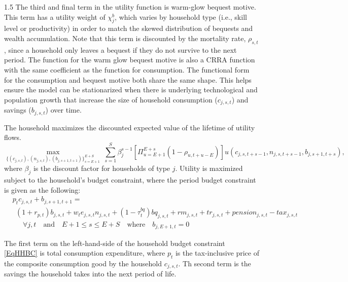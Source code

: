 \documentclass[letterpaper,12pt]{article}
\theoremstyle{definition}
\begin{document}
\begin{spacing}{1.5}
    The third and final term in the utility function is warm-glow bequest motive. This term has a utility weight of $\chi^b_j$, which varies by household type (i.e., skill level or productivity) in order to match the skewed distribution of bequests and wealth accumulation. Note that this term is discounted by the mortality rate, $\rho_{s,t}$, since a household only leaves a bequest if they do not survive to the next period. The function for the warm glow bequest motive is also a CRRA function with the same coefficient as the function for consumption. The functional form for the consumption and bequest motive both share the same shape. This helps ensure the model can be stationarized when there is underlying technological and population growth that increase the size of household consumption ($c_{j,s,t}$) and savings ($b_{j,s,t}$) over time.

    The household maximizes the discounted expected value of the lifetime of utility flows.
    \begin{equation}\label{EqHHmaxprob}
      \max_{\{(c_{j,s,t}),(n_{j,s,t}),(b_{j,s+1,t+1})\}_{s=E+1}^{E+S}}\: \sum_{s=1}^S\beta_j^{s-1}\left[\Pi_{u=E+1}^{E+s}(1 - \rho_{u,t+u-E})\right]u(c_{j,s,t+s-1},n_{j,s,t+s-1},b_{j,s+1,t+s}),
    \end{equation}
    where $\beta_j$ is the discount factor for households of type $j$.  Utility is maximized subject to the household's budget constraint, where the period budget constraint is given as the following:
    \begin{equation}\label{EqHHBC}
      \begin{split}
        &p_t c_{j,s,t} + b_{j,s+1,t+1} = \\
        &\:\:(1 + r_{p,t})b_{j,s,t} + w_t e_{j,s,t} n_{j,s,t}  + (1-\tau^{bq}_t)bq_{j,s,t} + rm_{j,s,t} + tr_{j,s,t} + pension_{j,s,t} - tax_{j,s,t}  \\
        &\quad\:\:\forall j,t\quad\text{and}\quad E+1\leq s\leq E+S \quad\text{where}\quad b_{j,E+1,t}=0
      \end{split}
    \end{equation}

    The first term on the left-hand-side of the household budget constraint \eqref{EqHHBC} is total consumption expenditure, where $p_t$ is the tax-inclusive price of the composite consumption good by the household $c_{j,s,t}$. Th second term is the savings the household takes into the next period of life.


\end{spacing}
\end{document}
